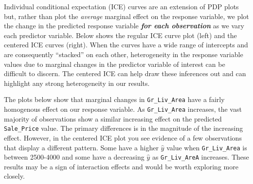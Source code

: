 \documentclass[]{book}
\newenvironment{Shaded}{\begin{snugshade}}{\end{snugshade}}
\newcommand{\CommentTok}[1]{\textcolor[rgb]{0.56,0.35,0.01}{\textit{#1}}}
\newcommand{\DataTypeTok}[1]{\textcolor[rgb]{0.13,0.29,0.53}{#1}}
\newcommand{\DecValTok}[1]{\textcolor[rgb]{0.00,0.00,0.81}{#1}}
\newcommand{\FloatTok}[1]{\textcolor[rgb]{0.00,0.00,0.81}{#1}}
\newcommand{\KeywordTok}[1]{\textcolor[rgb]{0.13,0.29,0.53}{\textbf{#1}}}
\newcommand{\NormalTok}[1]{#1}
\newcommand{\OperatorTok}[1]{\textcolor[rgb]{0.81,0.36,0.00}{\textbf{#1}}}
\newcommand{\OtherTok}[1]{\textcolor[rgb]{0.56,0.35,0.01}{#1}}
\newcommand{\StringTok}[1]{\textcolor[rgb]{0.31,0.60,0.02}{#1}}
\theoremstyle{definition}
\theoremstyle{definition}
\theoremstyle{definition}
\theoremstyle{remark}
\begin{document}
Individual conditional expectation (ICE) curves
\citep{goldstein2015peeking} are an extension of PDP plots but, rather
than plot the \emph{average} marginal effect on the response variable,
we plot the change in the predicted response variable \textbf{\emph{for
each observation}} as we vary each predictor variable. Below shows the
regular ICE curve plot (left) and the centered ICE curves (right). When
the curves have a wide range of intercepts and are consequently
``stacked'' on each other, heterogeneity in the response variable values
due to marginal changes in the predictor variable of interest can be
difficult to discern. The centered ICE can help draw these inferences
out and can highlight any strong heterogeneity in our results.

The plots below show that marginal changes in \texttt{Gr\_Liv\_Area}
have a fairly homogenous effect on our response variable. As
\texttt{Gr\_Liv\_Area} increases, the vast majority of observations show
a similar increasing effect on the predicted \texttt{Sale\_Price} value.
The primary differences is in the magnitude of the increasing effect.
However, in the centered ICE plot you see evidence of a few observations
that display a different pattern. Some have a higher \(\hat y\) value
when \texttt{Gr\_Liv\_Area} is between 2500-4000 and some have a
decreasing \(\hat y\) as \texttt{Gr\_Liv\_AreA} increases. These results
may be a sign of interaction effects and would be worth exploring more
closely.

\begin{Shaded}
\end{Shaded}
\end{document}
